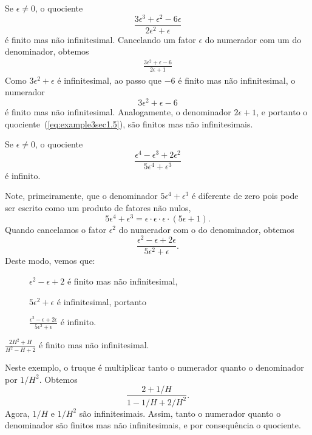 \begin{example}
Se $\epsilon \ne 0$, o quociente
$$
  \frac{3\epsilon^3 + \epsilon^2 - 6\epsilon}%
       {2\epsilon^2 + \epsilon}
$$
é finito mas não infinitesimal.
Cancelando um fator $\epsilon$ do numerador com um do denominador, obtemos
\begin{eqnarray}
  &\displaystyle \frac{3\epsilon^2 + \epsilon - 6}%
                      {2\epsilon + 1} &
  \label{eq:example3sec1.5}
\end{eqnarray}
Como $3\epsilon^2 + \epsilon$ é infinitesimal, ao passo que $-6$ é finito
mas não infinitesimal, o numerador
$$
  3\epsilon^2 + \epsilon - 6
$$
é finito mas não infinitesimal. Analogamente, o denominador $2\epsilon + 1$,
e portanto o quociente~(\ref{eq:example3sec1.5}), são finitos mas não
infinitesimais.
\end{example}

\begin{example}
Se $\epsilon \ne 0$, o quociente
$$
  \frac{\epsilon^4 - \epsilon^3 + 2\epsilon^2}%
       {5\epsilon^4 + \epsilon^3}
$$
é infinito.

Note, primeiramente, que o denominador $5\epsilon^4 + \epsilon^3$ é
diferente de zero pois pode ser escrito como um produto de fatores
não nulos,
$$
  5\epsilon^4 + \epsilon^3 =
  \epsilon \cdot \epsilon \cdot \epsilon \cdot (5\epsilon + 1).
$$
Quando cancelamos o fator $\epsilon^2$ do numerador com o do denominador,
obtemos
$$
  \frac{\epsilon^2 - \epsilon + 2\epsilon}%
       {5\epsilon^2 + \epsilon}.
$$
Deste modo, vemos que:
\begin{description}
\item[] $\epsilon^2 - \epsilon + 2$ é finito mas não infinitesimal,
\item[] $5\epsilon^2 + \epsilon$ é infinitesimal, portanto
\item[] $\displaystyle \frac{\epsilon^2 - \epsilon + 2\epsilon}%
                            {5\epsilon^2 + \epsilon}$
        é infinito.
\end{description}
\end{example}

\begin{example}
$\displaystyle \frac{2H^2 + H}{H^2 - H + 2}$ é finito mas não infinitesimal.

Neste exemplo, o truque é multiplicar tanto o numerador quanto o denominador
por $1/H^2$. Obtemos
$$
  \frac{2 + 1/H}{1 - 1/H + 2/H^2}.
$$
Agora, $1/H$ e $1/H^2$ são infinitesimais. Assim, tanto o numerador quanto
o denominador são finitos mas não infinitesimais, e por consequência o
quociente.
\end{example}

